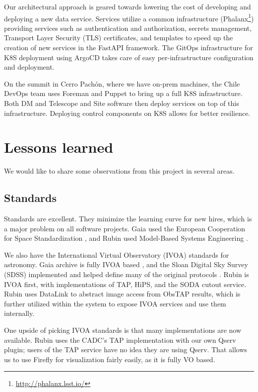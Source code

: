 \documentclass[11pt,twoside]{article}
\begin{document}
Our architectural approach is geared towards lowering the cost of developing and deploying a new data service.
Services utilize a common infrastructure (Phalanx\footnote{\url{http://phalanx.lsst.io/}}) providing services such as authentication and authorization, secrets management, Transport Layer Security (TLS) certificates, and templates to speed up the creation of new services in the FastAPI framework.
The GitOps infrastructure for K8S deployment using ArgoCD takes care of easy per-infrastructure configuration and deployment.

On the summit in Cerro Pach\'{o}n, where we have on-prem machines, the Chile DevOps team uses Foreman and Puppet to bring up a full K8S infrastructure.
Both DM and Telescope and Site software then deploy services on top of this infrastructure.
Deploying control components on K8S allows for better resilience.


\section{Lessons learned}
We would like to share some observations from this project in several areas.
\subsection{Standards}
Standards are excellent. They minimize the learning curve for new hires, which is a major problem on all software projects.
Gaia used the European Cooperation for Space Standardization \citep[ECSS;][]{2008ASPC..394..191O}, and
 Rubin used Model-Based Systems Engineering \citep[MBSE;][]{2018SPIE10705E..0US}.

We also have the International Virtual Observatory (IVOA) standards for astronomy. Gaia archive is fully IVOA based \citep{2019ASPC..523..445S,2015scop.confE...8G}, and the Sloan Digital Sky Survey (SDSS) implemented and helped define many of the original protocols \citep{2005ASPC..347..684T}.
Rubin is IVOA first, with implementations of TAP, HiPS, and the SODA cutout service.
Rubin uses DataLink to abstract image access from ObsTAP results, which is further utilized within the system to expose IVOA services and use them internally.

One upside of picking IVOA standards is that many implementations are now available.
Rubin uses the CADC's TAP implementation with our own Qserv plugin; users of the TAP service have no idea they are using Qserv.
That allows us to use Firefly for visualization fairly easily, as it is
fully VO based.
\end{document}
